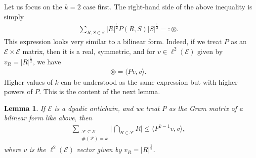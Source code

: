 \documentclass[oneside]{amsart}
\newtheorem{lemma}[theorem]{Lemma}
\theoremstyle{definition}
\theoremstyle{plain}
\numberwithin{equation}{section}
\numberwithin{theorem}{section}
\begin{document}
Let us focus on the $k=2$ case first.
The right-hand side of the above inequality is simply
\begin{align*}
  \sum_{R,S \in \mathcal{E}} |R|^{\frac{1}{2}} P(R,S) |S|^{\frac{1}{2}} =:
  \circledast.
\end{align*}
This expression looks very similar to a bilinear form. Indeed, if we treat $P$
as an $\mathcal{E}\times \mathcal{E}$ matrix, then it is a real, symmetric, and
for $v \in \ell^2(\mathcal{E})$ given by $v_R = |R|^{\frac{1}{2}}$, we have
\begin{align*}
  \circledast = \langle Pv, v \rangle.
\end{align*}
Higher values of $k$ can be understood as the same expression but with higher
powers of $P$. This is the content of the next lemma.
\begin{lemma} \label{bound_by_bilinear}
  If $\mathcal{E}$ is a dyadic antichain, and we treat $P$ as the Gram matrix of
  a bilinear form like above, then
  \begin{align*}
    \sum_{\substack{
      \mathcal{F} \subseteq \mathcal{E} \\
      \#(\mathcal{F}) = k
    }} \Bigg|\bigcap_{R \in \mathcal{F}} R \Bigg| \leq
    \langle P^{k-1} v, v \rangle,
  \end{align*}
  where $v$ is the $\ell^2(\mathcal{E})$ vector given by $v_R =
  |R|^{\frac{1}{2}}$.
\end{lemma}
\end{document}
